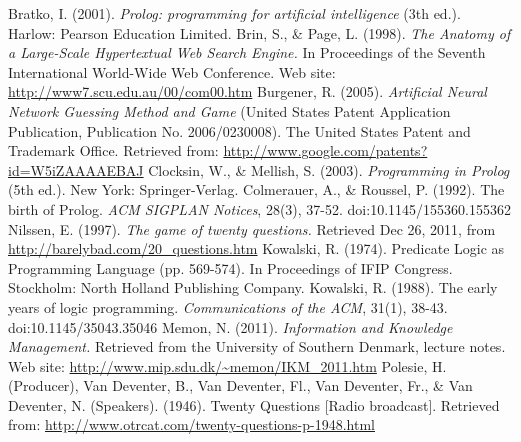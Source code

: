 \documentclass[a4paper]{article}
\begin{document}
\begin{thebibliography}{10}
Bratko, I. (2001). \textsl{Prolog: programming for artificial intelligence} (3th ed.). Harlow: Pearson Education Limited.
 Brin, S., \& Page, L. (1998). \textsl{The Anatomy of a Large-Scale Hypertextual Web Search Engine.} In Proceedings of the Seventh International World-Wide Web Conference. Web site: \url{http://www7.scu.edu.au/00/com00.htm}
Burgener, R. (2005). \textsl{Artificial Neural Network Guessing Method and Game} (United States Patent Application Publication, Publication No. 2006/0230008). The United States Patent and Trademark Office. Retrieved from: \url{http://www.google.com/patents?id=W5iZAAAAEBAJ}
Clocksin, W., \& Mellish, S. (2003). \textsl{Programming in Prolog} (5th ed.). New York: Springer-Verlag.
Colmerauer, A., \& Roussel, P. (1992). The birth of Prolog. \textsl{ACM SIGPLAN Notices}, 28(3), 37-52. doi:10.1145/155360.155362
Nilssen, E. (1997). \textsl{The game of twenty questions.} Retrieved Dec 26, 2011, from \url{http://barelybad.com/20_questions.htm}
Kowalski, R. (1974). Predicate Logic as Programming Language (pp. 569-574). In Proceedings of IFIP Congress. Stockholm: North Holland Publishing Company.
Kowalski, R. (1988). The early years of logic programming. \textsl{Communications of the ACM}, 31(1), 38-43. doi:10.1145/35043.35046
Memon, N. (2011). \textsl{Information and Knowledge Management.} Retrieved from the University of Southern Denmark, lecture notes. Web site: \url{http://www.mip.sdu.dk/~memon/IKM_2011.htm}
Polesie, H. (Producer), Van Deventer, B., Van Deventer, Fl., Van Deventer, Fr., \& Van Deventer, N. (Speakers). (1946). Twenty Questions [Radio broadcast]. Retrieved from: \url{http://www.otrcat.com/twenty-questions-p-1948.html}
\end{thebibliography}
\end{document}
